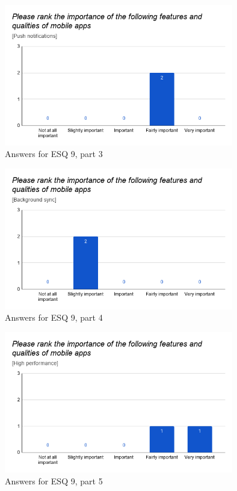 \documentclass[a4paper,12pt]{article}
\begin{document}
\begin{figure}[ht!]
    \centering
    \includegraphics[width=10cm]{img/Results/esq9_3.png}
    \caption{Answers for ESQ 9, part 3}
    \label{fig:res_eduq9_3}
\end{figure}

\begin{figure}[ht!]
    \centering
    \includegraphics[width=10cm]{img/Results/esq9_4.png}
    \caption{Answers for ESQ 9, part 4}
    \label{fig:res_eduq9_4}
\end{figure}

\begin{figure}[ht!]
    \centering
    \includegraphics[width=10cm]{img/Results/esq9_5.png}
    \caption{Answers for ESQ 9, part 5}
    \label{fig:res_eduq9_5}
\end{figure}
\end{document}
